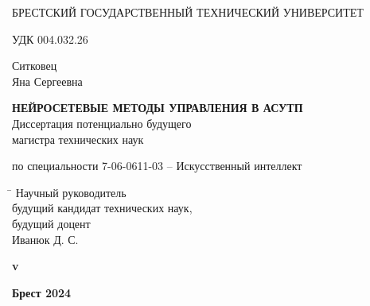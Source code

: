 \begin{titlepage}

    \begin{center} \bfseries
        \bigskip
        \medskip

        {БРЕСТСКИЙ ГОСУДАРСТВЕННЫЙ ТЕХНИЧЕСКИЙ УНИВЕРСИТЕТ}
    \end{center}
    \vspace{1cm}

    \noindent УДК 004.032.26 \\
    \vspace{1cm}

    \begin{center}
        {Ситковец \\ Яна Сергеевна}\\
        \vspace{1cm}

        {\bfseries НЕЙРОСЕТЕВЫЕ МЕТОДЫ УПРАВЛЕНИЯ В АСУТП}\\
        \vspace{2cm}
        Диссертация потенциально будущего\\
        магистра технических наук\\
        \bigskip

        по специальности 7-06-0611-03 -- Искусственный интеллект
    \end{center}
    \vspace{3cm}

    \begin{tabbing}
        \hspace{8cm} \= \kill \>
        Научный руководитель \+ \\
        будущий кандидат технических наук, \\будущий доцент\\
        Иванюк Д. С.
    \end{tabbing}


    \ifdefined\dissertationversion
        \vspace{3cm}
        \begin{center}
            \bfseries v\dissertationversion
        \end{center}
        \vspace{3cm}
    \else
        \vspace{7cm}
    \fi

    \begin{center}
        \bfseries Брест 2024
    \end{center}

\end{titlepage}